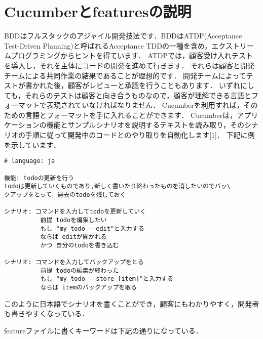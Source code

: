 \section{Cucumberとfeaturesの説明}
BDDはフルスタックのアジャイル開発技法です．BDDはATDP(Acceptance Test-Driven Planning)と呼ばれるAcceptance TDDの一種を含め，エクストリームプログラミングからヒントを得ています．
ATDPでは，顧客受け入れテストを導入し，それを主体にコードの開発を進めて行きます．
それらは顧客と開発チームによる共同作業の結果であることが理想的です．
開発チームによってテストが書かれた後，顧客がレビューと承認を行うこともあります．
いずれにしても，それらのテストは顧客と向き合うものなので，顧客が理解できる言語とフォーマットで表現されていなければなりません．
Cucumberを利用すれば，そのための言語とフォーマットを手に入れることができます．
Cucumberは，アプリケーションの機能とサンプルシナリオを説明するテキストを読み取り，そのシナリオの手順に従って開発中のコードとのやり取りを自動化します[1]．
下記に例を示しています．
\begin{lstlisting}[style=customRuby]
# language: ja

機能: todoの更新を行う
todoは更新していくものであり,新しく書いたり終わったものを消したいのでバッ\
クアップをとって，過去のtodoを残しておく

シナリオ: コマンドを入力してtodoを更新していく
          前提 todoを編集したい
          もし "my_todo --edit"と入力する
          ならば editが開かれる
          かつ 自分のtodoを書き込む

シナリオ: コマンドを入力してバックアップをとる
          前提 todoの編集が終わった
          もし "my_todo --store [item]"と入力する
          ならば itemのバックアップを取る
\end{lstlisting}
このように日本語でシナリオを書くことができ，顧客にもわかりやすく，開発者も書きやすくなっている．

featureファイルに書くキーワードは下記の通りになっている．

